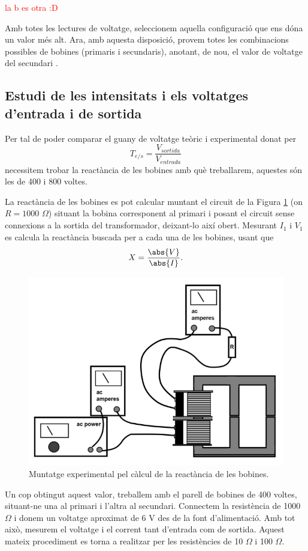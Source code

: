 \documentclass[a4paper,10.5pt]{report}
\begin{document}
\textcolor{red}{la b es otra :D} 

Amb totes les lectures de voltatge, seleccionem aquella configuració que ens dóna un valor més alt. Ara, amb aquesta disposició, provem totes les combinacions possibles de bobines (primaris i secundaris), anotant, de nou, el valor de voltatge del secundari .

\subsection{Estudi de les intensitats i els voltatges d'entrada i de sortida}
Per tal de poder comparar el guany de voltatge teòric i experimental donat per
\begin{equation}
	T_{e/s}=\frac{V_{sortida}}{V_{entrada}}
	\label{eq4:25}
\end{equation}
necessitem trobar la reactància de les bobines amb què treballarem, aquestes són les de 400 i 800 voltes.

La reactància de les bobines es pot calcular muntant el circuit de la Figura \ref{fig4:4} (on $R=1000$ $\Omega$) situant la bobina corresponent al primari i posant el circuit sense connexions a la sortida del transformador, deixant-lo així obert. Mesurant $I_1$ i $V_1$ es calcula la reactància buscada per a cada una de les bobines, usant que
\begin{equation}
	X = \frac{\abs{V}}{\abs{I}}.
\end{equation}

\begin{figure}[h]
	\centering
	\includegraphics[width=0.4\linewidth]{screenshot010}
	\caption{Muntatge experimental pel càlcul de la reactància de les bobines.}
	\label{fig4:4}
\end{figure}

Un cop obtingut aquest valor, treballem amb el parell de bobines de 400 voltes, situant-ne una al primari i l'altra al secundari. Connectem la resistència de 1000 $\Omega$ i donem un voltatge aproximat de 6 V des de la font d'alimentació. Amb tot això, mesurem el voltatge i el corrent tant d'entrada com de sortida. Aquest mateix procediment es torna a realitzar per les resistències de 10 $\Omega$ i 100 $\Omega$.
\end{document}
